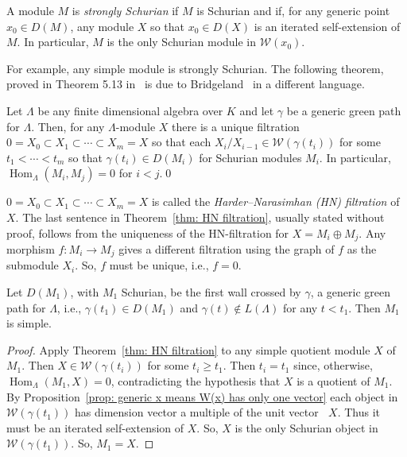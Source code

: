 \documentclass[ALCO,ThmDefs,Unicode,epreuves]{cedram}
\DeclareMathOperator{\Hom}{Hom}%
\DeclareMathOperator{\undim}{\underline{dim}}
\newcommand{\cW}{\ensuremath{{\mathcal{W}}}}
\begin{document}
  

\begin{defi} 
A module $M$ is \emph{strongly Schurian} if $M$ is Schurian and if, for any generic point $x_0\in D(M)$, any module $X$ so that $x_0\in D(X)$ is an iterated self-extension of $M$. In particular, $M$ is the only Schurian module in $\cW(x_0)$.
\end{defi}

For example, any simple module is strongly Schurian. The following theorem, proved in Theorem 5.13 in~\cite{PartI} is due to Bridgeland~\cite{Bridgeland} in a different language.

\begin{theo}\label{thm: HN filtration} Let $\Lambda$ be any finite dimensional algebra over $K$ and let $\gamma$ be a generic green path for $\Lambda$. Then, for any $\Lambda$-module $X$ there is a unique filtration $0=X_0\subset X_1\subset \cdots\subset X_m=X$ so that each $X_i/X_{i-1}\in\cW(\gamma(t_i))$ for some $t_1<\cdots<t_m$ so that $\gamma(t_i)\in D(M_i)$ for Schurian modules $M_i$. In particular, $\Hom_\Lambda(M_i,M_j)=0$ for $i<j$.\qed
\end{theo}

$0=X_0\subset X_1\subset \cdots\subset X_m=X$ is called the \emph{Harder--Narasimhan (HN) filtration} of $X$. The last sentence in Theorem~\ref{thm: HN filtration}, usually stated without proof, follows from the uniqueness of the HN-filtration for $X=M_i\oplus M_j$. Any morphism $f:M_i\to M_j$ gives a different filtration using the graph of $f$ as the submodule $X_i$. So, $f$ must be unique, i.e., $f=0$.

\begin{coro}\label{cor: first wall is simple}
Let $D(M_1)$, with $M_1$ Schurian, be the first wall crossed by $\gamma$, a generic green path for $\Lambda$, i.e., $\gamma(t_1)\in D(M_1)$ and $\gamma(t)\notin L(\Lambda)$ for any $t<t_1$. Then $M_1$ is simple.
\end{coro}

\begin{proof}
Apply Theorem~\ref{thm: HN filtration} to any simple quotient module $X$ of $M_1$. Then $X\in \cW(\gamma(t_i))$ for some $t_i\ge t_1$. Then $t_i=t_1$ since, otherwise, $\Hom_\Lambda(M_1,X)=0$, contradicting the hypothesis that $X$ is a quotient of $M_1$. By Proposition~\ref{prop: generic x means W(x) has only one vector} each object in $\cW(\gamma(t_1))$ has dimension vector a multiple of the unit vector $\undim X$. Thus it must be an iterated self-extension of $X$. So, $X$ is the only Schurian object in $\cW(\gamma(t_1))$. So, $M_1=X$.
\end{proof}
\end{document}
